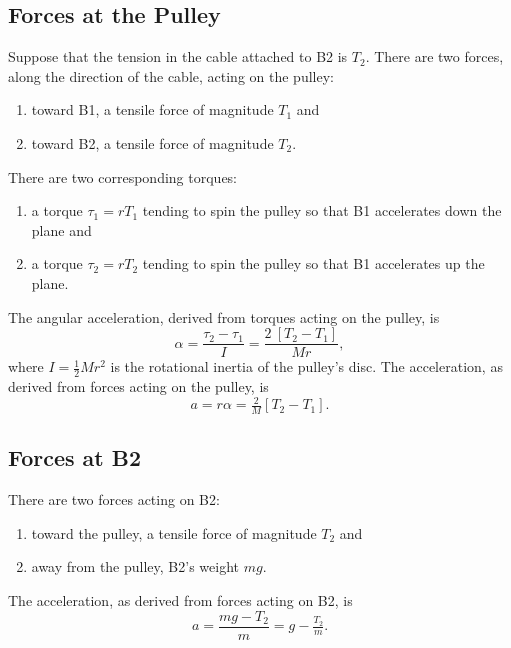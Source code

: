 \documentclass[twocolumn]{article}
\begin{document}
\subsection{Forces at the Pulley}

Suppose that the tension in the cable attached to B2 is $T_2$. There are two
forces, along the direction of the cable, acting on the pulley:
\begin{enumerate}[noitemsep]
   \item toward B1, a tensile force of magnitude $T_1$ and
   \item toward B2, a tensile force of magnitude $T_2$.
\end{enumerate}
There are two corresponding torques:
\begin{enumerate}
   \item a torque $\tau_1 = r T_1$ tending to spin the pulley so that B1
      accelerates down the plane and
   \item a torque $\tau_2 = r T_2$ tending to spin the pulley so that B1
      accelerates up the plane.
\end{enumerate}
The angular acceleration, derived from torques acting on the pulley, is
\begin{equation}
   \alpha = \frac{\tau_2 - \tau_1}{I} = \frac{2 \: [T_2 - T_1]}{M r},
\end{equation}
where $I = \tfrac{1}{2} M r^2$ is the rotational inertia of the pulley's disc.
The acceleration, as derived from forces acting on the pulley, is
\begin{equation}
   a = r \alpha = \tfrac{2}{M} [T_2 - T_1].
   \label{eq:pulley}
\end{equation}

\subsection{Forces at B2}

There are two forces acting on B2:
\begin{enumerate}[noitemsep]
   \item toward the pulley, a tensile force of magnitude $T_2$ and
   \item away from the pulley, B2's weight $mg$.
\end{enumerate}
The acceleration, as derived from forces acting on B2, is
\begin{equation}
   a = \frac{mg - T_2}{m} = g - \tfrac{T_2}{m}.
   \label{eq:B2}
\end{equation}
\end{document}
